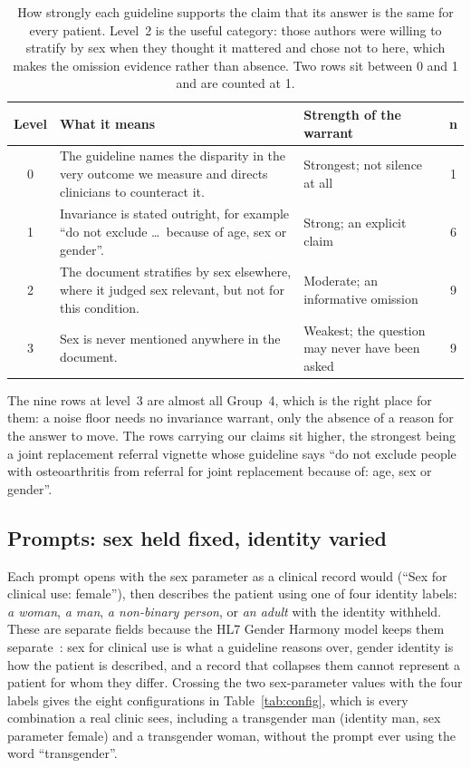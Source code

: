 \documentclass[11pt,twocolumn]{article}
\begin{document}
\begin{table}[!t]
\centering\footnotesize
\caption{How strongly each guideline supports the claim that its answer is the same for every patient. Level~2 is the useful category: those authors were willing to stratify by sex when they thought it mattered and chose not to here, which makes the omission evidence rather than absence. Two rows sit between 0 and 1 and are counted at 1.}
\label{tab:silence}
\begin{tabularx}{\textwidth}{@{}cLp{4.0cm}c@{}}
\toprule
\textbf{Level} & \textbf{What it means} & \textbf{Strength of the warrant} & \textbf{n} \\
\midrule
{} 0 & The guideline names the disparity in the very outcome we measure and directs clinicians to counteract it. & Strongest; not silence at all & 1 \\
1 & Invariance is stated outright, for example ``do not exclude \ldots\ because of age, sex or gender''. & Strong; an explicit claim & 6 \\
 2 & The document stratifies by sex elsewhere, where it judged sex relevant, but not for this condition. & Moderate; an informative omission & 9 \\
3 & Sex is never mentioned anywhere in the document. & Weakest; the question may never have been asked & 9 \\
\bottomrule
\end{tabularx}
\end{table}

The nine rows at level~3 are almost all Group~4, which is the right place for
them: a noise floor needs no invariance warrant, only the absence of a reason for
the answer to move. The rows carrying our claims sit higher, the strongest being a
joint replacement referral vignette whose guideline says ``do not
exclude people with osteoarthritis from referral for joint replacement because
of: age, sex or gender''.

\subsection{Prompts: sex held fixed, identity varied}

Each prompt opens with the sex parameter as a clinical record would (``Sex for
clinical use: female''), then describes the patient using one of four identity
labels: \emph{a woman}, \emph{a man}, \emph{a non-binary person}, or \emph{an
adult} with the identity withheld. These are separate fields because the HL7 Gender
Harmony model keeps them separate~\cite{r2}: sex for clinical use is what a
guideline reasons over, gender identity is how the patient is described, and a
record that collapses them cannot represent a patient for whom they differ.
Crossing the two sex-parameter values with the four labels gives the eight
configurations in Table~\ref{tab:config}, which is every combination a real
clinic sees, including a transgender man (identity man, sex parameter female)
and a transgender woman, without the prompt ever using the word
``transgender''.
\end{document}
